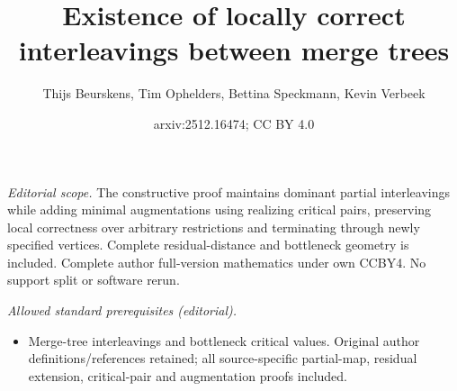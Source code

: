 \documentclass[11pt]{article}
\title{Existence of locally correct interleavings between merge trees}
\author{Thijs Beurskens, Tim Ophelders, Bettina Speckmann, Kevin Verbeek}
\date{arxiv:2512.16474; CC BY 4.0}
\begin{document}
\maketitle
\noindent\textit{Editorial scope.} The constructive proof maintains dominant partial interleavings while adding minimal augmentations using realizing critical pairs, preserving local correctness over arbitrary restrictions and terminating through newly specified vertices. Complete residual-distance and bottleneck geometry is included. Complete author full-version mathematics under own CCBY4. No support split or software rerun.\par\medskip
\noindent\textit{Allowed standard prerequisites (editorial).}\begin{itemize}
\item Merge-tree interleavings and bottleneck critical values. Original author definitions/references retained; all source-specific partial-map, residual extension, critical-pair and augmentation proofs included.
\end{itemize}\medskip
\end{document}
